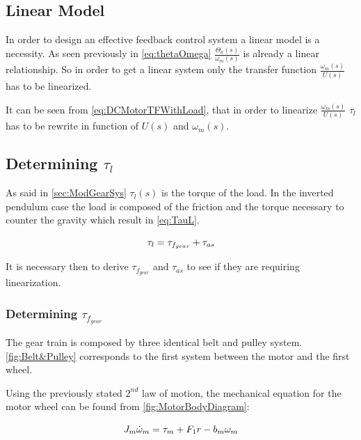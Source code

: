 \subsection{Linear Model}

In order to design an effective feedback control system a linear model is a necessity. As seen previously in \autoref{eq:thetaOmega} $\frac{\Theta_a(s)}{\omega_m(s)}$ is already a linear relationship. So in order to get a linear system only the transfer function $\frac{\omega_m(s)}{U(s)}$ has to be linearized.

It can be seen from \autoref{eq:DCMotorTFWithLoad}, that in order to linearize $\frac{\omega_m(s)}{U(s)}$ $\tau_l$ has to be rewrite in function of $U(s)$ and $\omega_m(s)$.

\subsection{Determining $\tau_l$}
As said in \autoref{sec:ModGearSys} $\tau_l(s)$ is the torque of the load. In the inverted pendulum case the load is composed of the friction and the torque necessary to counter the gravity which result in \autoref{eq:TauL}.

\begin{equation}\label{eq:TauL}
	\tau_l = \tau_{f_{gear}} + \tau_{as} \addunit{\newton\meter}
\end{equation}

It is necessary then to derive $\tau_{f_{gear}}$ and $\tau_{as}$ to see if they are requiring linearization.


\subsubsection*{Determining $\tau_{f_{gear}}$}
The gear train is composed by three identical belt and pulley system. \autoref{fig:Belt&Pulley} corresponds to the first system between the motor and the first wheel. 

Using the previously stated $2^{nd}$ law of motion, the mechanical equation for the motor wheel can be found from \autoref{fig:MotorBodyDiagram}:

\begin{equation}
    J_m \dot{\omega}_m = \tau_m + F_1r - b_m\omega_m \addunit{\newton\meter}
    \label{eq:MotorfreeBody}
\end{equation}


